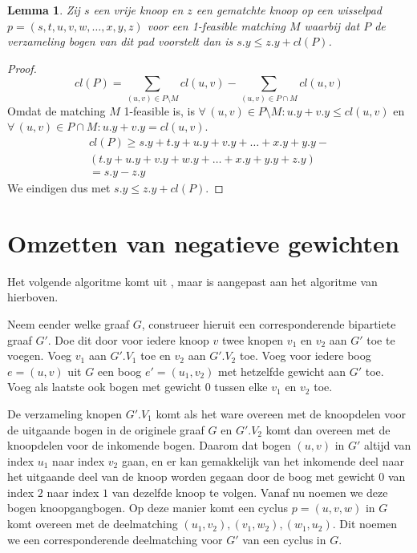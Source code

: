 \documentclass[conference]{IEEEtran}
\newtheorem{lemma}{Lemma}[section]
\theoremstyle{definition}
\let \oldforall \forall
\renewcommand{\forall}{\oldforall\,}
\begin{document}
\begin{lemma}
    Zij $s$ een vrije knoop en $z$ een gematchte knoop op een wisselpad $p = (s, t, u, v, w, \dots, x, y, z)$ voor een 1-feasible matching $M$ waarbij dat $P$ de verzameling bogen van dit pad voorstelt dan is $s.y \leq z.y + cl(P)$.
\end{lemma}
\begin{proof}
    \begin{equation*}
        cl(P) = \sum_{(u, v) \in P \setminus M} cl(u, v) - \sum_{(u, v) \in P \cap M} cl(u, v)
    \end{equation*}
    Omdat de matching $M$ 1-feasible is, is $\forall (u, v) \in P \setminus M: u.y + v.y \leq cl(u, v)$ en $\forall (u, v) \in P \cap M: u.y + v.y = cl(u, v)$.
    \begin{gather*}
        cl(P) \geq s.y + t.y + u.y + v.y + \dots + x.y + y.y - \\
        (t.y + u.y + v.y + w.y + \dots + x.y + y.y + z.y) \\
        = s.y - z.y
    \end{gather*}
    We eindigen dus met $s.y \leq z.y + cl(P)$.
\end{proof}

\section{Omzetten van negatieve gewichten}
Het volgende algoritme komt uit \cite{Scaling}, maar is aangepast aan het algoritme van hierboven.

Neem eender welke graaf $G$, construeer hieruit een corresponderende bipartiete graaf $G'$. Doe dit door voor iedere knoop $v$ twee knopen $v_1$ en $v_2$ aan $G'$ toe te voegen. Voeg $v_1$ aan $G'.V_1$ toe en $v_2$ aan $G'.V_2$ toe. Voeg voor iedere boog $e = (u, v)$ uit $G$ een boog $e' = (u_1, v_2)$ met hetzelfde gewicht aan $G'$ toe. Voeg als laatste ook bogen met gewicht $0$ tussen elke $v_1$ en $v_2$ toe.

De verzameling knopen $G'.V_1$ komt als het ware overeen met de knoopdelen voor de uitgaande bogen in de originele graaf $G$ en $G'.V_2$ komt dan overeen met de knoopdelen voor de inkomende bogen. Daarom dat bogen $(u, v)$ in $G'$ altijd van index $u_1$ naar index $v_2$ gaan, en er kan gemakkelijk van het inkomende deel naar het uitgaande deel van de knoop worden gegaan door de boog met gewicht $0$ van index $2$ naar index $1$ van dezelfde knoop te volgen. Vanaf nu noemen we deze bogen knoopgangbogen. Op deze manier komt een cyclus $p = (u, v, w)$ in $G$ komt overeen met de deelmatching ${(u_1, v_2), (v_1, w_2), (w_1, u_2)}$. Dit noemen we een corresponderende deelmatching voor $G'$ van een cyclus in $G$.
\end{document}

